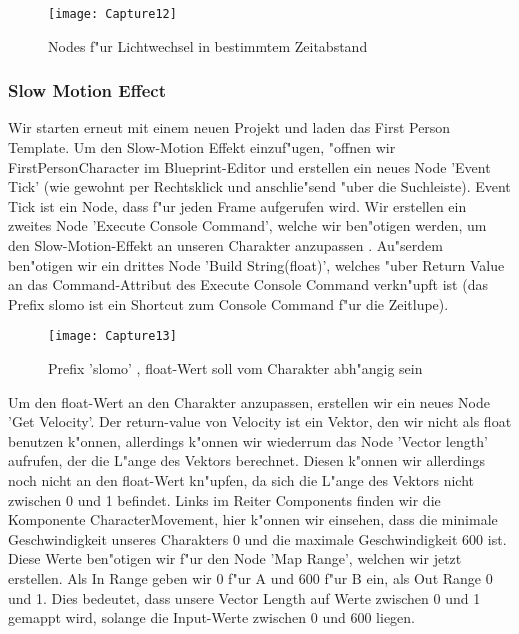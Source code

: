 \documentclass[11pt, titlepage]{article}
\begin{document}
\newpage
\begin{figure}[h]
\texttt{[image: Capture12]}
\caption{Nodes f"ur Lichtwechsel in bestimmtem Zeitabstand}
\end{figure}
\subsubsection{Slow Motion Effect}

\noindent Wir starten erneut mit einem neuen Projekt und laden das First Person Template. Um den Slow-Motion Effekt einzuf"ugen, "offnen wir FirstPersonCharacter im Blueprint-Editor und erstellen ein neues Node 'Event Tick' (wie gewohnt per Rechtsklick und anschlie"send "uber die Suchleiste). Event Tick ist ein Node, dass f"ur jeden Frame aufgerufen wird. \newline
\newline
\newline
\noindent Wir erstellen ein zweites Node 'Execute Console Command', welche wir ben"otigen werden, um den Slow-Motion-Effekt an unseren Charakter anzupassen . Au"serdem ben"otigen wir ein drittes Node 'Build String(float)', welches "uber Return Value an das Command-Attribut des Execute Console Command verkn"upft ist (das Prefix slomo ist ein Shortcut zum Console Command f"ur die Zeitlupe).

\begin{figure}[h]
\texttt{[image: Capture13]}
\caption{Prefix 'slomo' , float-Wert soll vom Charakter abh"angig sein}
\end{figure}

\noindent Um den float-Wert an den Charakter anzupassen, erstellen wir ein neues Node 'Get Velocity'. Der return-value von Velocity ist ein Vektor, den wir nicht als float benutzen k"onnen, allerdings k"onnen wir wiederrum das Node 'Vector length' aufrufen, der die L"ange des Vektors berechnet. Diesen k"onnen wir allerdings noch nicht an den float-Wert kn"upfen, da sich die L"ange des Vektors nicht zwischen 0 und 1 befindet. Links im Reiter Components finden wir die Komponente CharacterMovement, hier k"onnen wir einsehen, dass die minimale Geschwindigkeit unseres Charakters 0 und die maximale Geschwindigkeit 600 ist. Diese Werte ben"otigen wir f"ur den Node 'Map Range', welchen wir jetzt erstellen. Als In Range geben wir 0 f"ur A und 600 f"ur B ein, als Out Range 0 und 1. Dies bedeutet, dass unsere Vector Length auf Werte zwischen 0 und 1 gemappt wird, solange die Input-Werte zwischen 0 und 600 liegen.
\end{document}

